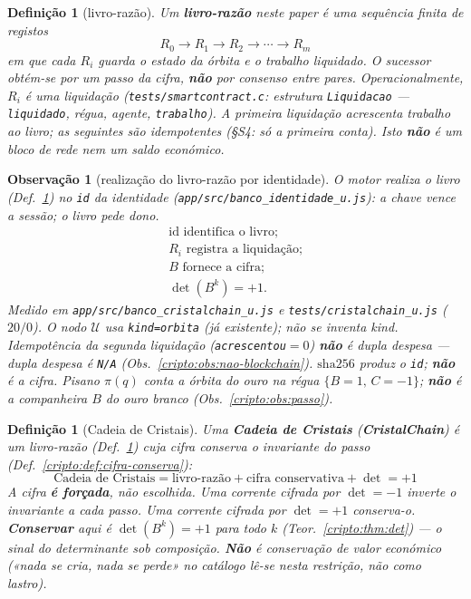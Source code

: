 \documentclass[11pt,a4paper]{article}
\newcommand{\code}[1]{\texttt{\small #1}}
\newtheorem{definicao}[teorema]{Definição}
\newtheorem{observacao}[teorema]{Observação}
\begin{document}
\begin{definicao}[livro-razão]\label{cripto:def:livro-razao}
Um \textbf{livro-razão} neste paper é uma sequência finita de
registos
\[
R_0\to R_1\to R_2\to\cdots\to R_m
\]
em que cada $R_i$ guarda o estado da órbita e o trabalho liquidado.
O sucessor obtém-se por um passo da cifra, \textbf{não} por consenso
entre pares.
Operacionalmente, $R_i$ é uma liquidação
(\code{tests/smartcontract.c}: estrutura \texttt{Liquidacao} ---
\texttt{liquidado}, régua, agente, \texttt{trabalho}).
A primeira liquidação acrescenta trabalho ao livro; as seguintes
são idempotentes (§S4: só a primeira conta).
Isto \textbf{não} é um bloco de rede nem um saldo económico.
\end{definicao}

\begin{observacao}[realização do livro-razão por identidade]\label{cripto:obs:livro-identidade}
O motor realiza o livro (Def.~\ref{cripto:def:livro-razao})
no \code{id} da identidade
(\code{app/src/banco\_identidade\_u.js}):
a chave vence a sessão; o livro pede dono.
\[
\boxed{\;
\begin{array}{c}
\mathrm{id}\text{ identifica o livro;}\\
R_i\text{ registra a liquidação;}\\
B\text{ fornece a cifra;}\\
\det(B^{k})=+1.
\end{array}
\;}
\]
Medido em \code{app/src/banco\_cristalchain\_u.js}
e \code{tests/cristalchain\_u.js} ($20/0$).
O nodo $\mathcal{U}$ usa \code{kind=orbita} (já existente);
não se inventa kind.
Idempotência da segunda liquidação
(\code{acrescentou}$=0$) \textbf{não} é dupla despesa ---
dupla despesa é \texttt{N/A}
(Obs.~\ref{cripto:obs:nao-blockchain}).
$\mathrm{sha256}$ produz o \code{id}; \textbf{não} é a cifra.
Pisano $\pi(q)$ conta a órbita do ouro na régua $\{B=1,\,C=-1\}$;
\textbf{não} é a companheira $B$ do ouro branco
(Obs.~\ref{cripto:obs:passo}).
\end{observacao}

\begin{definicao}[Cadeia de Cristais]\label{cripto:def:cadeia}
Uma \textbf{Cadeia de Cristais} (\textbf{CristalChain}) é um
livro-razão (Def.~\ref{cripto:def:livro-razao}) cuja cifra conserva
o invariante do passo (Def.~\ref{cripto:def:cifra-conserva}):
\[
\boxed{\;
\text{Cadeia de Cristais}
=
\text{livro-razão}
+
\text{cifra conservativa}
+
\det=+1
\;}
\]
A cifra \textbf{é forçada}, não escolhida.
Uma corrente cifrada por $\det=-1$ inverte o invariante a cada passo.
Uma corrente cifrada por $\det=+1$ conserva-o.
\textbf{Conservar} aqui é $\det(B^{k})=+1$ para todo $k$
(Teor.~\ref{cripto:thm:det}) --- o sinal do determinante sob
composição. \textbf{Não} é conservação de valor económico
(«nada se cria, nada se perde» no catálogo lê-se nesta restrição,
não como lastro).
\end{definicao}
\end{document}
